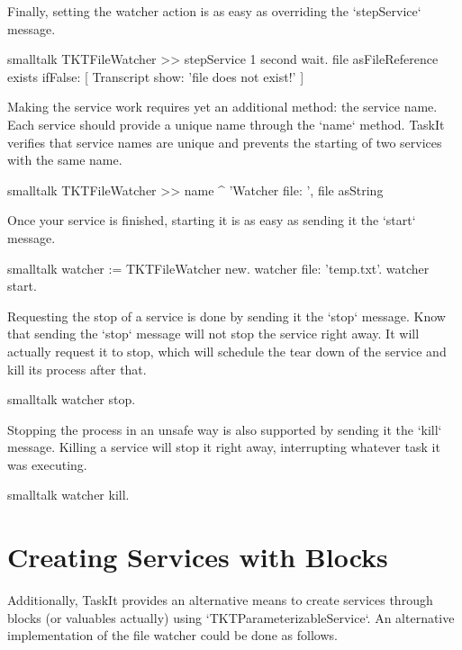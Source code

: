 \documentclass[10pt,twoside,english]{_support/latex/sbabook/sbabook}
\begin{document}
Finally, setting the watcher action is as easy as overriding the `stepService` message.

\begin{displaycode}{smalltalk}
TKTFileWatcher >> stepService
  1 second wait.
  file asFileReference exists
    ifFalse: [ Transcript show: 'file does not exist!' ]
\end{displaycode}

Making the service work requires yet an additional method: the service name. Each service should provide a unique name through the `name` method. TaskIt verifies that service names are unique and prevents the starting of two services with the same name.

\begin{displaycode}{smalltalk}
TKTFileWatcher >> name
  ^ 'Watcher file: ', file asString
\end{displaycode}

Once your service is finished, starting it is as easy as sending it the `start` message.

\begin{displaycode}{smalltalk}
watcher := TKTFileWatcher new.
watcher file: 'temp.txt'.
watcher start.
\end{displaycode}

Requesting the stop of a service is done by sending it the `stop` message. Know that sending the `stop` message will not stop the service right away. It will actually request it to stop, which will schedule the tear down of the service and kill its process after that. 

\begin{displaycode}{smalltalk}
watcher stop.
\end{displaycode}

Stopping the process in an unsafe way is also supported by sending it the `kill` message. Killing a service will stop it right away, interrupting whatever task it was executing.

\begin{displaycode}{smalltalk}
watcher kill.
\end{displaycode}
\section{Creating Services with Blocks}
Additionally, TaskIt provides an alternative means to create services through blocks (or valuables actually) using `TKTParameterizableService`. An alternative implementation of the file watcher could be done as follows.
\end{document}
